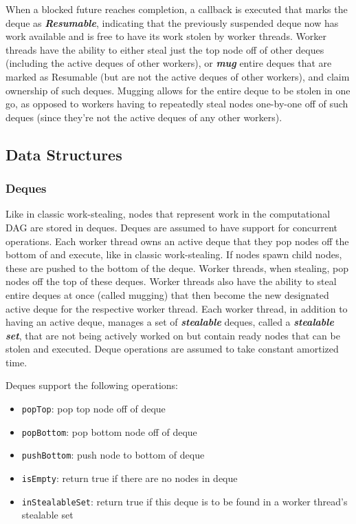 \documentclass[bsc,frontabs,singlespacing,parskip,deptreport,normalheadings]{infthesis}
\begin{document}
When a blocked future reaches completion, a callback is executed that marks the
deque as \textbf{\textit{Resumable}}, indicating that the previously suspended
deque now has work available and is free to have its work stolen by worker
threads. Worker threads have the ability to either steal just the top node off
of other deques (including the active deques of other workers), or
\textit{\textbf{mug}} entire deques that are marked as Resumable (but are not
the active deques of other workers), and claim ownership of such deques. Mugging
allows for the entire deque to be stolen in one go, as opposed to workers having
to repeatedly steal nodes one-by-one off of such deques (since they're not the
active deques of any other workers). 

\subsection{Data Structures}

\subsubsection*{Deques}
\label{subsubsection:deques}

Like in classic work-stealing, nodes that represent work in the computational
DAG are stored in deques. Deques are assumed to have support for concurrent
operations. Each worker thread owns an active deque that they pop nodes off the
bottom of and execute, like in classic work-stealing. If nodes spawn child
nodes, these are pushed to the bottom of the deque. Worker threads, when
stealing, pop nodes off the top of these deques. Worker threads also have the
ability to steal entire deques at once (called mugging) that then become the new
designated active deque for the respective worker thread. Each worker thread, in
addition to having an active deque, manages a set of \textbf{\textit{stealable}}
deques, called a \textbf{\textit{stealable set}}, that are not being actively
worked on but contain ready nodes that can be stolen and executed. Deque
operations are assumed to take constant amortized time.

Deques support the following operations:

\begin{itemize}
    \item \texttt{popTop}: pop top node off of deque
    \item \texttt{popBottom}: pop bottom node off of deque
    \item \texttt{pushBottom}: push node to bottom of deque
    \item \texttt{isEmpty}: return true if there are no nodes in deque
    \item \texttt{inStealableSet}: return true if this deque is to be found in a
        worker thread's stealable set
\end{itemize}
\end{document}
